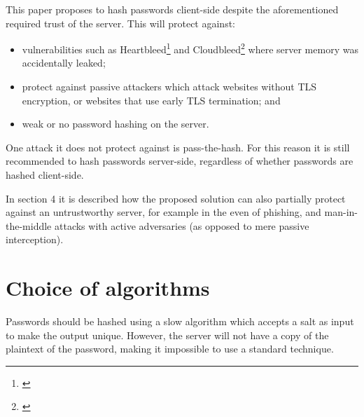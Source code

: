 \documentclass{paper}
\begin{document}
This paper proposes to hash passwords client-side despite the aforementioned required trust
of the server. This will protect against:

\begin{itemize}
\item vulnerabilities such as
Heartbleed\footnote{\href{https://en.wikipedia.org/wiki/Heartbleed}{\underline{}}}
and Cloudbleed\footnote{{\href{https://en.wikipedia.org/wiki/Cloudbleed}{\underline{}}}} where server memory was accidentally leaked;

\item protect against passive attackers which attack websites without TLS encryption, or
websites that use early TLS termination\footnotemark; and

\item weak or no password hashing on the server.
\end{itemize}


One attack it does not protect against is pass-the-hash. For this reason it is still
recommended to hash passwords server-side, regardless of whether passwords are hashed
client-side.

In section 4 it is described how the proposed solution can also partially protect against an
untrustworthy server, for example in the even of phishing, and man-in-the-middle attacks with
active adversaries (as opposed to mere passive interception).

\section{Choice of algorithms}

Passwords should be hashed using a slow algorithm which accepts a salt as input to make the
output unique. However, the server will not have a copy of the plaintext of the password,
making it impossible to use a standard technique.
\end{document}
